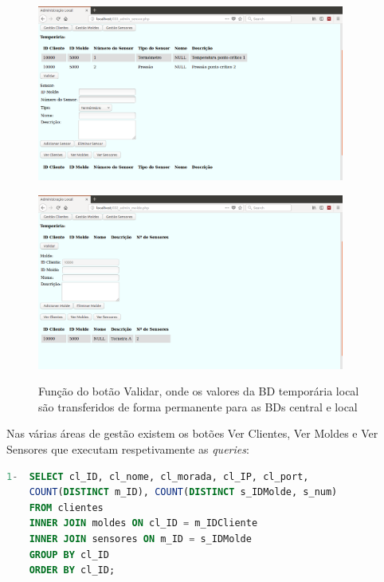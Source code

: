 \documentclass[11pt,twoside,a4paper]{report}
\begin{document}
\begin{figure}
	\centering
	\begin{minipage}{1\textwidth}
		\begin{center}
			\includegraphics[width=0.9\textwidth]{administracao07} %
			\label{fig:admin12}
		\end{center}
	\end{minipage}
	\begin{minipage}{1\textwidth}
		\begin{center}
			\includegraphics[width=0.9\textwidth]{administracao08} %
			\label{fig:admin13}
		\end{center}
	\end{minipage}
	\caption[Função do botão Validar]{Função do botão Validar, onde os valores da BD temporária local são transferidos de forma permanente para as BDs central e local}
	\label{fig:admin11}
\end{figure}
Nas várias áreas de gestão existem os botões Ver Clientes, Ver Moldes e Ver Sensores que executam respetivamente as \textit{queries}:
\begin{lstlisting}[language = SQL]
1-	SELECT cl_ID, cl_nome, cl_morada, cl_IP, cl_port,
	COUNT(DISTINCT m_ID), COUNT(DISTINCT s_IDMolde, s_num)
	FROM clientes
	INNER JOIN moldes ON cl_ID = m_IDCliente
	INNER JOIN sensores ON m_ID = s_IDMolde
	GROUP BY cl_ID
	ORDER BY cl_ID;
\end{lstlisting}
\end{document}
